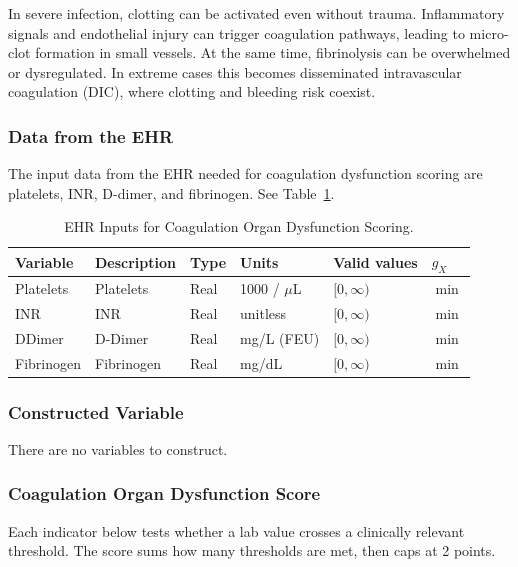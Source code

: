 \documentclass[letterpaper,10pt]{article}
\begin{document}
In severe infection, clotting can be activated even without trauma.
Inflammatory signals and endothelial injury can trigger coagulation
pathways, leading to micro-clot formation in small vessels. At the same
time, fibrinolysis can be overwhelmed or dysregulated. In extreme cases
this becomes disseminated intravascular coagulation (DIC), where
clotting and bleeding risk coexist.

\subsubsection{Data from the EHR}\label{sec:coag-ehr}
The input data from the EHR needed for coagulation dysfunction scoring are
platelets, INR, D-dimer, and fibrinogen. See Table~\ref{tab:coag-ehr}.

\begin{table}
  \centering
  \caption{EHR Inputs for Coagulation Organ Dysfunction Scoring.}
  \label{tab:coag-ehr}
  \small
  \begin{tabular}{llllll}
    \toprule
    \textbf{Variable} &
    \textbf{Description} &
    \textbf{Type} &
    \textbf{Units} &
    \textbf{Valid values} &
    \textbf{$g_X$} \\
    \midrule
    Platelets  & Platelets  & Real & 1000 / $\mu$L & $[0, \infty)$ & $\min$ \\
    INR        & INR        & Real & unitless      & $[0, \infty)$ & $\min$ \\
    DDimer     & D-Dimer    & Real & mg/L (FEU)    & $[0, \infty)$ & $\min$ \\
    Fibrinogen & Fibrinogen & Real & mg/dL         & $[0, \infty)$ & $\min$ \\
    \bottomrule
  \end{tabular}
\end{table}

\subsubsection{Constructed Variable}\label{sec:coag-constructed}

There are no variables to construct.

\subsubsection{Coagulation Organ Dysfunction Score}\label{sec:coag-score}
Each indicator below tests whether a lab value crosses a clinically
relevant threshold. The score sums how many thresholds are met, then
caps at 2 points.
\end{document}

